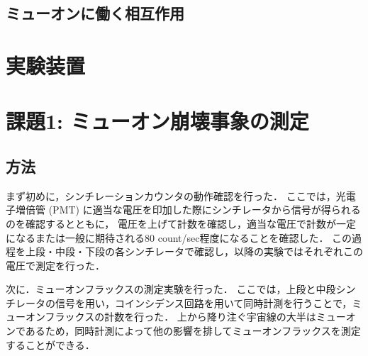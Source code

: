 \documentclass[uplatex,dvipdfmx,a4j,12pt]{jsarticle}
\begin{document}
\subsection{ミューオンに働く相互作用}


\section{実験装置}

\section{課題1: ミューオン崩壊事象の測定}
\subsection{方法}
まず初めに，シンチレーションカウンタの動作確認を行った．
ここでは，光電子増倍管 (PMT) に適当な電圧を印加した際にシンチレータから信号が得られるのを確認するとともに，
電圧を上げて計数を確認し，適当な電圧で計数が一定になるまたは一般に期待される80 count/sec程度になることを確認した．
この過程を上段・中段・下段の各シンチレータで確認し，以降の実験ではそれぞれこの電圧で測定を行った．

次に．ミューオンフラックスの測定実験を行った．
ここでは，上段と中段シンチレータの信号を用い，コインシデンス回路を用いて同時計測を行うことで，ミューオンフラックスの計数を行った．
上から降り注ぐ宇宙線の大半はミューオンであるため，同時計測によって他の影響を排してミューオンフラックスを測定することができる．
\end{document}
